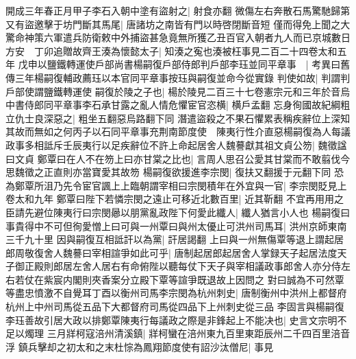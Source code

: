 開成三年春正月甲子李石入朝中塗有盜射之|{
	射食亦翻}
微傷左右奔散石馬驚馳歸第又有盜邀擊于坊門斷其馬尾|{
	唐諸坊之南皆有門以時啓閉斷音短}
僅而得免上聞之大驚命神策六軍遣兵防衛敕中外捕盜甚急竟無所獲乙丑百官入朝者九人而已京城數日方安　丁卯追贈故齊王湊為懷懿太子|{
	知湊之寃也湊被枉事見二百二十四卷太和五年}
戊申以鹽鐵轉運使戶部尚書楊嗣復戶部侍郎判戶部李珏並同平章事　|{
	考異曰舊傳三年楊嗣復輔政薦珏以本官同平章事按珏與嗣復並命今從實錄}
判使如故|{
	判謂判戶部使謂鹽鐵轉運使}
嗣復於陵之子也|{
	楊於陵見二百三十七卷憲宗元和三年於音烏}
中書侍郎同平章事李石承甘露之亂人情危懼宦官恣横|{
	横戶孟翻}
忘身徇國故紀綱粗立仇士良深惡之|{
	粗坐五翻惡烏路翻下同}
潛遣盜殺之不果石懼累表稱疾辭位上深知其故而無如之何丙子以石同平章事充荆南節度使　陳夷行性介直惡楊嗣復為人每議政事多相詆斥壬辰夷行以足疾辭位不許上命起居舍人魏謩獻其祖文貞公笏|{
	魏徵諡曰文貞}
鄭覃曰在人不在笏上曰亦甘棠之比也|{
	言周人思召公愛其甘棠而不敢翦伐今思魏徵之正直則亦當寶愛其故笏}
楊嗣復欲援進李宗閔|{
	復扶又翻援于元翻下同}
恐為鄭覃所沮乃先令宦官諷上上臨朝謂宰相曰宗閔積年在外宜與一官|{
	李宗閔貶見上卷太和九年}
鄭覃曰陛下若憐宗閔之遠止可移近北數百里|{
	近其靳翻}
不宜再用用之臣請先避位陳夷行曰宗閔曏以朋黨亂政陛下何愛此纖人|{
	纖人猶言小人也}
楊嗣復曰事貴得中不可但徇愛憎上曰可與一州覃曰與州太優止可洪州司馬耳|{
	洪州京師東南三千九十里}
因與嗣復互相詆訐以為黨|{
	訐居謁翻}
上曰與一州無傷覃等退上謂起居郎周敬復舍人魏謩曰宰相諠爭如此可乎|{
	唐制起居郎起居舍人掌録天子起居法度天子御正殿則郎居左舍人居右有命俯陛以聽每仗下天子與宰相議政事郎舍人亦分侍左右若仗在紫宸内閣則夾香案分立殿下覃等諠爭既退故上因問之}
對曰誠為不可然覃等盡忠憤激不自覺耳丁酉以衡州司馬李宗閔為杭州刺史|{
	唐制衡州中洪州上都督府杭州上中州司馬從五品下大都督府司馬從四品下上州刺史從三品}
李固言與楊嗣復李珏善故引居大政以排鄭覃陳夷行每議政之際是非鋒起上不能决也|{
	史言文宗明不足以燭理}
三月牂柯寇涪州清溪鎮|{
	牂柯蠻在涪州東九百里東距辰州二千四百里涪音浮}
鎮兵擊却之初太和之末杜悰為鳳翔節度使有詔沙汰僧尼|{
	事見}


